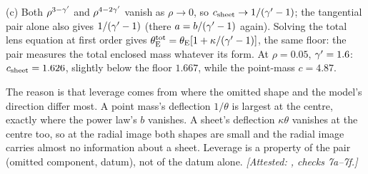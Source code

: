 (c) Both $\rho^{3-\gamma'}$ and $\rho^{4-2\gamma'}$ vanish as $\rho\to0$,
so $c_{\rm sheet}\to1/(\gamma'-1)$; the tangential pair alone also gives
$1/(\gamma'-1)$ (there $a=b/(\gamma'-1)$ again). Solving the total lens equation
at first order gives $\theta_{\mathrm{E}}^{\rm tot}=\theta_{\mathrm{E}}[1+\kappa/(\gamma'-1)]$, the
same floor: the pair measures the total enclosed mass whatever its
form. At $\rho=0.05$, $\gamma'=1.6$: $c_{\rm sheet}=1.626$, slightly
below the floor $1.667$, while the point-mass $c=4.87$.

The reason is that leverage comes from where the omitted shape and the
model's direction differ most. A point mass's deflection $1/\theta$ is
largest at the centre, exactly where the power law's $b$ vanishes. A
sheet's deflection $\kappa\theta$ vanishes at the centre too, so
at the radial image both shapes are small and the radial image carries
almost no information about a sheet. Leverage is a property of the pair
(omitted component, datum), not of the datum alone.
\emph{[Attested: , checks 7a--7f.]}
